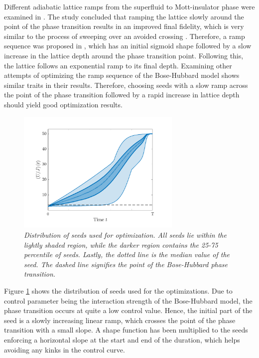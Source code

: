 Different adiabatic lattice ramps from the superfluid to Mott-insulator phase were examined in \cite{Zakrzewski2009}. The study concluded that ramping the lattice slowly around the point of the phase transition results in an improved final fidelity, which is very similar to the process of sweeping over an avoided crossing \cite{manybodyBloch}.
Therefore, a ramp sequence was proposed in \cite{Zakrzewski2009}, which has an initial sigmoid shape followed by a slow increase in the lattice depth around the phase transition point. Following this, the lattice follows an exponential ramp to its final depth. Examining other attempts of optimizing the ramp sequence of the Bose-Hubbard model \cite{Doria2011,FrankBloch} shows similar traits in their results. Therefore, choosing seeds with a slow ramp across the point of the phase transition followed by a rapid increase in lattice depth should yield good optimization results.
\begin{figure}[h!]
    \centering
    \includegraphics[width=0.7\textwidth]{Figures/LinSigSeed.pdf}
    \caption{\textit{Distribution of seeds used for optimization. All seeds lie within the lightly shaded region, while the darker region contains the 25-75 percentile of seeds. Lastly, the dotted line is the median value of the seed. The dashed line signifies the point of the Bose-Hubbard phase transition.}}
    \label{fig:LinSigSeed}
\end{figure}
Figure \ref{fig:LinSigSeed} shows the distribution of seeds used for the optimizations. Due to control parameter being the interaction strength of the Bose-Hubbard model, the phase transition occurs at quite a low control value. Hence, the initial part of the seed is a slowly increasing linear ramp, which crosses the point of the phase transition with a small slope. A shape function has been multiplied to the seeds enforcing a horizontal slope at the start and end of the duration, which helps avoiding any kinks in the control curve.



